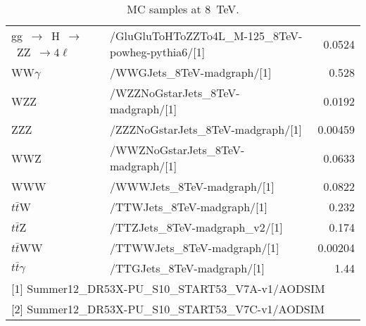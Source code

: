 \documentclass[a4paper]{article}
\begin{document}
\begin{landscape}
\begin{table}[ht]
\begin{small}
\begin{tabular}{l|l|r}
 gg~$\to$~H~$\to$~ZZ~$\to 4\ell$                      & /GluGluToHToZZTo4L\_M-125\_8TeV-powheg-pythia6/[1]                     &  0.0524\\
 WW$\gamma$                                           & /WWGJets\_8TeV-madgraph/[1]                                            &   0.528\\
 WZZ                                                  & /WZZNoGstarJets\_8TeV-madgraph/[1]                                     &  0.0192\\
 ZZZ                                                  & /ZZZNoGstarJets\_8TeV-madgraph/[1]                                     & 0.00459\\
 WWZ                                                  & /WWZNoGstarJets\_8TeV-madgraph/[1]                                     &  0.0633\\
 WWW                                                  & /WWWJets\_8TeV-madgraph/[1]                                            &  0.0822\\
 $t\bar{t}$W                                          & /TTWJets\_8TeV-madgraph/[1]                                            &   0.232\\
 $t\bar{t}$Z                                          & /TTZJets\_8TeV-madgraph\_v2/[1]                                        &   0.174\\
 $t\bar{t}$WW                                         & /TTWWJets\_8TeV-madgraph/[1]                                           & 0.00204\\
 $t\bar{t}\gamma$                                     & /TTGJets\_8TeV-madgraph/[1]                                            &    1.44\\
\hline
\multicolumn{3}{l}{[1] Summer12\_DR53X-PU\_S10\_START53\_V7A-v1/AODSIM}\\
\multicolumn{3}{l}{[2] Summer12\_DR53X-PU\_S10\_START53\_V7C-v1/AODSIM}\\
\hline
\end{tabular}
\caption{MC samples at 8~TeV.}
\label{tab:mc_samples}
\end{small}
\end{table}

\end{landscape}
\end{document}
